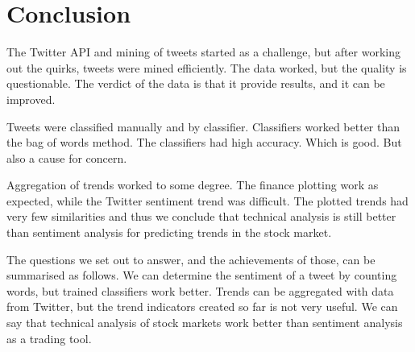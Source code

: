 \chapter{Conclusion}\label{conclusion}

The Twitter API and mining of tweets started as a challenge, but after
working out the quirks, tweets were mined efficiently. The data worked,
but the quality is questionable. The verdict of the data is that it
provide results, and it can be improved.    

Tweets were classified manually and by classifier. Classifiers worked better
than the bag of words method. The classifiers had high accuracy. Which is good.
But also a cause for concern. 

Aggregation of trends worked to some degree. The finance plotting work as
expected, while the Twitter sentiment trend was difficult. The plotted trends
had very few similarities and thus we conclude that technical analysis is still
better than sentiment analysis for predicting trends in the stock market.   

The questions we set out to answer, and the achievements of those, can be
summarised as follows. We can determine the sentiment of a tweet by counting
words, but trained classifiers work better. Trends can be aggregated with data
from Twitter, but the trend indicators created so far is not very useful. We can
say that technical analysis of stock markets work better than sentiment
analysis as a trading tool.
